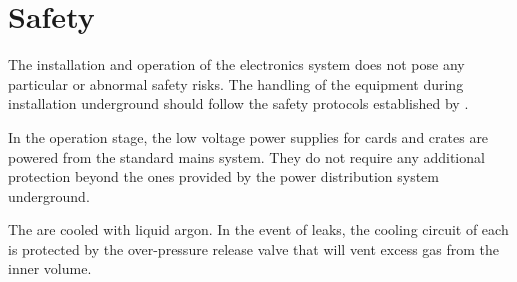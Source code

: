\section{Safety}
\label{sec:dp-tpcelec-safety}
The installation and operation of the electronics system does not pose any particular or abnormal safety risks. The handling of the equipment during installation underground should follow the safety protocols established by . 

In the operation stage, the low voltage power supplies for  cards and  crates are powered from the standard mains system. They do not require any additional protection beyond the ones provided by the power distribution system underground. 

The  are cooled with liquid argon. In the event of leaks, the cooling circuit of each  is protected by the over-pressure release valve that will vent excess gas from the inner volume.  
